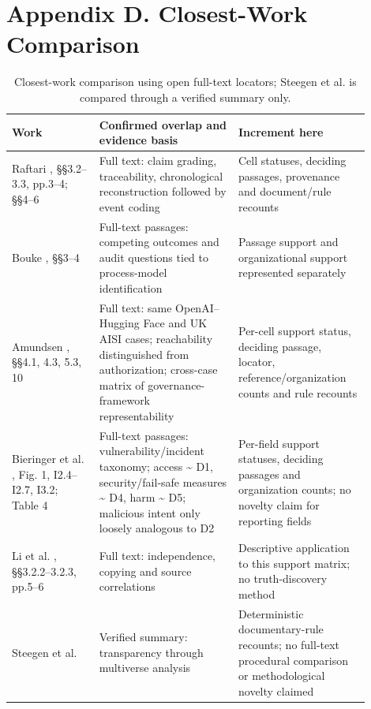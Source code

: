 \documentclass[conference]{IEEEtran}
\providecommand{\citep}[1]{\cite{#1}}
\begin{document}
\section*{Appendix D. Closest-Work Comparison}

\begin{table}[t]\centering\small
\setlength{\tabcolsep}{4pt}
\caption{Closest-work comparison using open full-text locators; Steegen et al. is compared through a verified summary only.}
\begin{tabular}{>{\raggedright\arraybackslash}p{0.221\linewidth}>{\raggedright\arraybackslash}p{0.353\linewidth}>{\raggedright\arraybackslash}p{0.321\linewidth}}
\toprule
Work & Confirmed overlap and evidence basis & Increment here \\
\midrule
Raftari \citep{raftari2026from}, §§3.2--3.3, pp.3--4; §§4--6 & Full text: claim grading, traceability, chronological reconstruction followed by event coding & Cell statuses, deciding passages, provenance and document/rule recounts \\
Bouke \citep{bouke2026competing}, §§3--4 & Full-text passages: competing outcomes and audit questions tied to process-model identification & Passage support and organizational support represented separately \\
Amundsen \citep{amundsen2026cross}, §§4.1, 4.3, 5.3, 10 & Full text: same OpenAI--Hugging Face and UK AISI cases; reachability distinguished from authorization; cross-case matrix of governance-framework representability & Per-cell support status, deciding passage, locator, reference/organization counts and rule recounts \\
Bieringer et al. \citep{bieringer2024practice}, Fig. 1, I2.4--I2.7, I3.2; Table 4 & Full-text passages: vulnerability/incident taxonomy; access \textasciitilde{} D1, security/fail-safe measures \textasciitilde{} D4, harm \textasciitilde{} D5; malicious intent only loosely analogous to D2 & Per-field support statuses, deciding passages and organization counts; no novelty claim for reporting fields \\
Li et al. \citep{li2016survey}, §§3.2.2--3.2.3, pp.5--6 & Full text: independence, copying and source correlations & Descriptive application to this support matrix; no truth-discovery method \\
Steegen et al. \citep{steegen2016increasing} & Verified summary: transparency through multiverse analysis & Deterministic documentary-rule recounts; no full-text procedural comparison or methodological novelty claimed \\
\bottomrule
\end{tabular}
\end{table}
\end{document}
